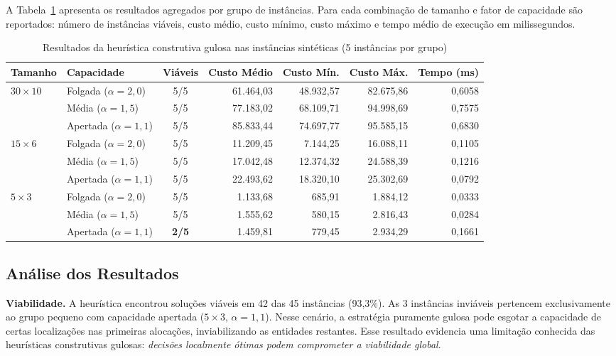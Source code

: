 \documentclass[12pt]{article}
\begin{document}
A Tabela~\ref{tab:resultados} apresenta os resultados agregados por grupo de
instâncias. Para cada combinação de tamanho e fator de capacidade são reportados:
número de instâncias viáveis, custo médio, custo mínimo, custo máximo e tempo
médio de execução em milissegundos.

\begin{table}[ht]
\centering
\caption{Resultados da heurística construtiva gulosa nas instâncias sintéticas
         (5 instâncias por grupo)}
\label{tab:resultados}
\begin{tabular}{llcrrrr}
\toprule
\textbf{Tamanho} & \textbf{Capacidade} & \textbf{Viáveis} &
\textbf{Custo Médio} & \textbf{Custo Mín.} & \textbf{Custo Máx.} &
\textbf{Tempo (ms)} \\
\midrule
\multirow{3}{*}{$30 \times 10$}
  & Folgada ($\alpha=2{,}0$)   & 5/5 & 61.464,03 & 48.932,57 & 82.675,86 & 0,6058 \\
  & Média ($\alpha=1{,}5$)     & 5/5 & 77.183,02 & 68.109,71 & 94.998,69 & 0,7575 \\
  & Apertada ($\alpha=1{,}1$)  & 5/5 & 85.833,44 & 74.697,77 & 95.585,15 & 0,6830 \\
\midrule
\multirow{3}{*}{$15 \times 6$}
  & Folgada ($\alpha=2{,}0$)   & 5/5 & 11.209,45 & 7.144,25  & 16.088,11 & 0,1105 \\
  & Média ($\alpha=1{,}5$)     & 5/5 & 17.042,48 & 12.374,32 & 24.588,39 & 0,1216 \\
  & Apertada ($\alpha=1{,}1$)  & 5/5 & 22.493,62 & 18.320,10 & 25.302,69 & 0,0792 \\
\midrule
\multirow{3}{*}{$5 \times 3$}
  & Folgada ($\alpha=2{,}0$)   & 5/5 & 1.133,68  & 685,91    & 1.884,12  & 0,0333 \\
  & Média ($\alpha=1{,}5$)     & 5/5 & 1.555,62  & 580,15    & 2.816,43  & 0,0284 \\
  & Apertada ($\alpha=1{,}1$)  & \textbf{2/5} & 1.459,81 & 779,45 & 2.934,29 & 0,1661 \\
\bottomrule
\end{tabular}
\end{table}

\subsection{Análise dos Resultados}

\textbf{Viabilidade.} A heurística encontrou soluções viáveis em 42 das 45
instâncias (93,3\%). As 3 instâncias inviáveis pertencem exclusivamente ao grupo
pequeno com capacidade apertada ($5 \times 3$, $\alpha = 1{,}1$). Nesse cenário,
a estratégia puramente gulosa pode esgotar a capacidade de certas localizações
nas primeiras alocações, inviabilizando as entidades restantes. Esse resultado
evidencia uma limitação conhecida das heurísticas construtivas gulosas:
\textit{decisões localmente ótimas podem comprometer a viabilidade global}.
\end{document}
